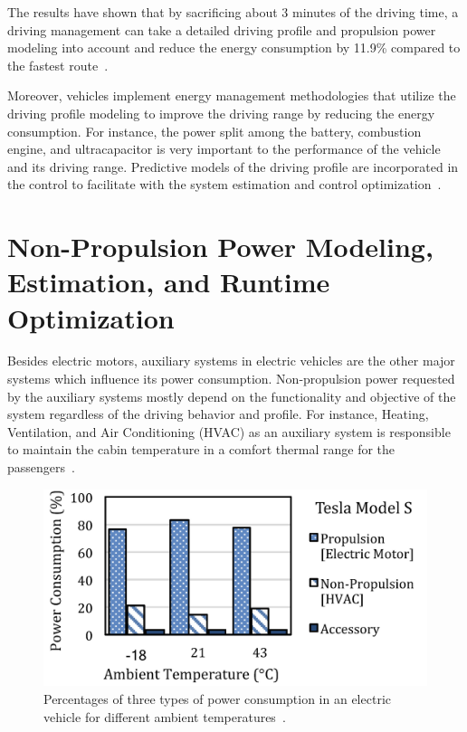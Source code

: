 The results have shown that by sacrificing about 3 minutes of the driving time, a driving management can take a detailed driving profile and propulsion power modeling into account and reduce the energy consumption by 11.9\% compared to the fastest route~\cite{AF_11,AF_17}.

Moreover, vehicles implement energy management methodologies that utilize the driving profile modeling to improve the driving range by reducing the energy consumption. For instance, the power split among the battery, combustion engine, and ultracapacitor is very important to the performance of the vehicle and its driving range. Predictive models of the driving profile are incorporated in the control to facilitate with the system estimation and control optimization~\cite{Park:DAC13,AF_8,AF_10,AF_34,AF_35,AF_36}.


\section{Non-Propulsion Power Modeling, Estimation, and Runtime Optimization} \label{sec:non-propulsion}

Besides electric motors, auxiliary systems in electric vehicles are the other major systems which influence its power consumption. Non-propulsion power requested by the auxiliary systems mostly depend on the functionality and objective of the system regardless of the driving behavior and profile. For instance, Heating, Ventilation, and Air Conditioning (HVAC) as an auxiliary system is responsible to maintain the cabin temperature in a comfort thermal range for the passengers~\cite{AF_13,AF_14,AF_15,AF_16}.

\begin{figure}
\centering
\includegraphics[width=0.8\hsize]{Figures/Al_Faruque/AF_figure2.jpeg}
\caption{Percentages of three types of power consumption in an electric vehicle for different ambient temperatures~\cite{AF_1,AF_10}.}
\label{AF_image2}
\end{figure}      


